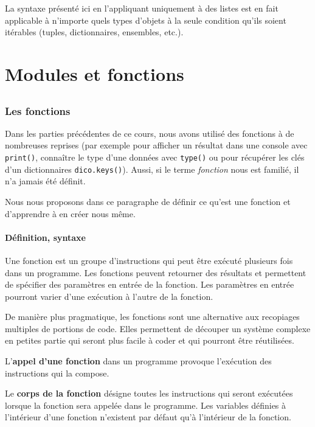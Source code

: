 \documentclass[12pt, a4paper]{article}
\begin{document}
La syntaxe présenté ici en l'appliquant uniquement à des listes est en fait applicable à n'importe quels types d'objets à la seule condition qu'ils soient itérables (tuples, dictionnaires, ensembles, etc.).



\newpage
\part{Modules et fonctions}
\chapter{}

\section{Les fonctions}
\label{sec:fonctions}
Dans les parties précédentes de ce cours, nous avons utilisé des fonctions à de nombreuses reprises (par exemple pour afficher un résultat dans une console avec \lstinline{print()}, connaître le type d'une données avec \lstinline{type()} ou pour récupérer les clés d'un dictionnaires \lstinline{dico.keys()}). Aussi, si le terme \textit{fonction} nous est familié, il n'a jamais été définit.

Nous nous proposons dans ce paragraphe de définir ce qu'est une fonction et d'apprendre à en créer nous même.

\subsection{Définition, syntaxe}
Une fonction est un groupe d'instructions qui peut être exécuté plusieurs fois dans un programme. Les fonctions peuvent retourner des résultats et permettent de spécifier des paramètres en entrée de la fonction. Les paramètres en entrée pourront varier d'une exécution à l'autre de la fonction.

De manière plus pragmatique, les fonctions sont une alternative aux recopiages multiples de portions de code. Elles permettent de découper un système complexe en petites partie qui seront plus facile à coder et qui pourront être réutilisées.

L'\textbf{appel d'une fonction} dans un programme provoque l'exécution des instructions qui la compose.

Le \textbf{corps de la fonction} désigne toutes les instructions qui seront exécutées lorsque la fonction sera appelée dans le programme. Les variables définies à l'intérieur d'une fonction n'existent par défaut qu'à l'intérieur de la fonction. 
\end{document}
